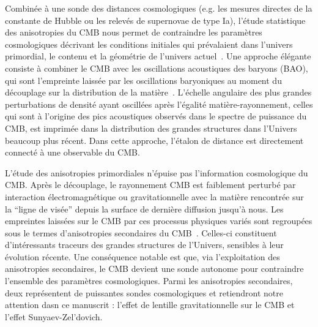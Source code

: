 Combinée à une sonde des distances cosmologiques (e.g. les mesures
directes de la constante de Hubble ou les relevés de supernovae de
type Ia), l'étude statistique des anisotropies du CMB nous permet de
contraindre les paramètres cosmologiques décrivant les conditions
initiales qui prévalaient dans l'univers primordial, le contenu et la
géométrie de l'univers actuel~.
Une approche élégante consiste à combiner le CMB avec les
oscillations acoustiques des baryons (BAO), qui sont l'empreinte
laissée par les oscillations baryoniques au moment du découplage sur
la distribution de la matière~. L'échelle angulaire des plus
grandes perturbations de densité ayant oscillées après l'égalité
matière-rayonnement, celles qui sont à l'origine des pics acoustiques
observés dans le spectre de puissance du CMB, est imprimée dans la
distribution des grandes structures dans l'Univers beaucoup plus
récent. Dans cette approche, l'étalon de distance est directement
connecté à une observable du CMB. 


L'étude des anisotropies primordiales n'épuise pas l'information
cosmologique du CMB. Après le découplage, le rayonnement CMB est
faiblement perturbé par interaction électromagnétique ou
gravitationnelle avec la matière rencontrée sur la ``ligne de visée''
depuis la surface de dernière diffusion jusqu'à nous. Les empreintes
laissées sur le CMB par ces processus physiques variés sont regroupées
sous le termes d'anisotropies secondaires du CMB~. Celles-ci
constituent d'intéressants traceurs des grandes structures de
l'Univers, sensibles à leur évolution récente. Une conséquence notable
est que, via l'exploitation des anisotropies secondaires, le CMB
devient une sonde autonome pour contraindre l'ensemble des paramètres
cosmologiques. Parmi les anisotropies secondaires, deux représentent
de puissantes sondes cosmologiques et retiendront notre attention dasn
ce manuscrit : l'effet de lentille gravitationnelle sur le CMB et
l'effet Sunyaev-Zel'dovich.

